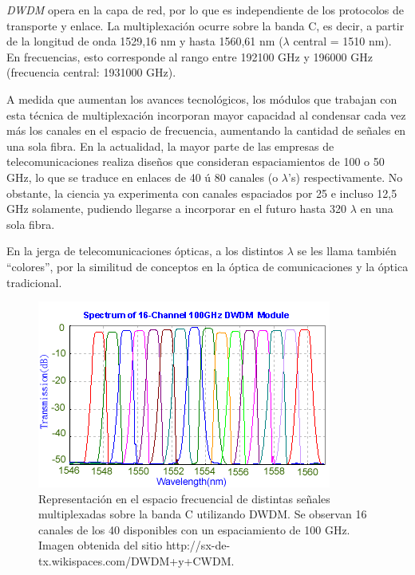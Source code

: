 \emph{DWDM} opera en la capa de red, por lo que es independiente de
los protocolos de transporte y enlace. La multiplexación ocurre sobre
la banda C, es decir, a partir de la longitud de onda 1529,16 nm y
hasta 1560,61 nm ($\lambda$ central = 1510 nm). En frecuencias, esto
corresponde al rango entre 192100 GHz y 196000 GHz (frecuencia
central: 1931000 GHz).

A medida que aumentan los avances tecnológicos, los módulos que
trabajan con esta técnica de multiplexación incorporan mayor capacidad
al condensar cada vez más los canales en el espacio de frecuencia,
aumentando la cantidad de señales en una sola fibra. En la actualidad,
la mayor parte de las empresas de telecomunicaciones realiza diseños
que consideran espaciamientos de 100 o 50 GHz, lo que se traduce en
enlaces de 40 ú 80 canales (o $\lambda$'s) respectivamente. No
obstante, la ciencia ya experimenta con canales espaciados por 25 e
incluso 12,5 GHz solamente, pudiendo llegarse a incorporar en el
futuro hasta 320 $\lambda$ en una sola fibra. 

En la jerga de telecomunicaciones ópticas, a los distintos $\lambda$
se les llama también ``colores'', por la similitud de conceptos en la
óptica de comunicaciones y la óptica tradicional.

\begin{figure}[H]
  \centering
  \includegraphics[scale=1]{Imagenes/DWDM_channels.png}
  \caption{Representación en el espacio frecuencial de distintas
    señales multiplexadas sobre la banda C utilizando DWDM. Se
    observan 16 canales de los 40 disponibles con un espaciamiento de
    100 GHz. Imagen obtenida del sitio
    http://sx-de-tx.wikispaces.com/DWDM+y+CWDM.}
  \label{fig:dwdmchannels}
\end{figure}


